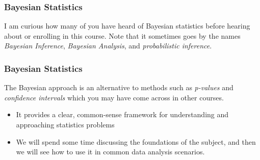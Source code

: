 \documentclass{beamer}
\begin{document}
\begin{frame}
\frametitle{Bayesian Statistics}
I am curious how many of you have heard of Bayesian statistics before
hearing about or enrolling in this course. Note that it sometimes goes by the
names {\em Bayesian Inference}, {\em Bayesian Analysis}, and
{\em probabilistic inference}.


\end{frame}

\begin{frame}
\frametitle{Bayesian Statistics}
The Bayesian approach is an alternative to methods such as
{\em p-values} and {\em confidence intervals} which you may have come across
in other courses.\pause

\begin{itemize}
\item It provides a clear, common-sense framework for
understanding and approaching statistics problems\pause
\item We will spend some time discussing the foundations of the
subject, and then we will see how to use it in common data analysis scenarios.
\end{itemize}


\end{frame}
\end{document}
